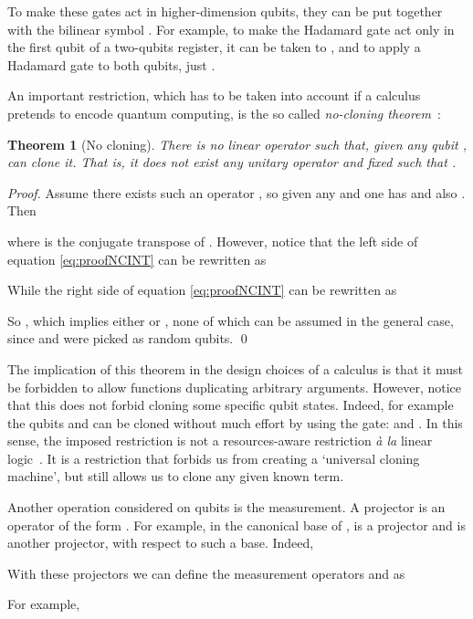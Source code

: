 \documentclass[preprint]{elsarticle}
\newtheorem{theorem}{Theorem}[section]
\begin{document}
To make these gates act in higher-dimension qubits, they can be put together
with the bilinear symbol . For example, to make the Hadamard gate act
only in the first qubit of a two-qubits register, it can be taken to , and to apply a Hadamard gate to both qubits, just .

An important restriction, which has to be taken into account if a calculus
pretends to encode quantum computing, is the so called {\em no-cloning
  theorem}~\cite{WoottersZurekNATURE82}:

\begin{theorem}[No cloning]\label{thm:nocloningINT}
  There is no linear operator such that, given any qubit
  , can clone it. That is, it does not exist any
  unitary operator  and fixed  such that
  .
\end{theorem}
\begin{proof}
  Assume there exists such an operator , so given any  and
   one has  and also
  . Then
  
  where  is the conjugate transpose of .
  However, notice that the left side of equation \eqref{eq:proofNCINT} can be
  rewritten as
  
  While the right side of equation \eqref{eq:proofNCINT} can be rewritten as
  

  So , which implies either
   or , none of which can be
  assumed in the general case, since  and  were
  picked as random qubits. \qed
\end{proof}

The implication of this theorem in the design choices of a calculus is that it
must be forbidden to allow functions duplicating arbitrary arguments. However,
notice that this does not forbid cloning some specific qubit states. Indeed, for
example the qubits  and  can be cloned without much effort by
using the  gate:  and . In
this sense, the imposed restriction is not a resources-aware restriction {\em
  \`a la} linear logic~\cite{GirardTCS87}. It is a restriction that forbids us
from creating a `universal cloning machine', but still allows us to clone any
given known term.

Another operation considered on qubits is the measurement. A projector is an
operator of the form . For example, in the canonical base
 of ,  is a projector and
 is another projector, with respect to such a base. Indeed,

With these projectors we can define the measurement operators  and  as

For example,
\end{document}
